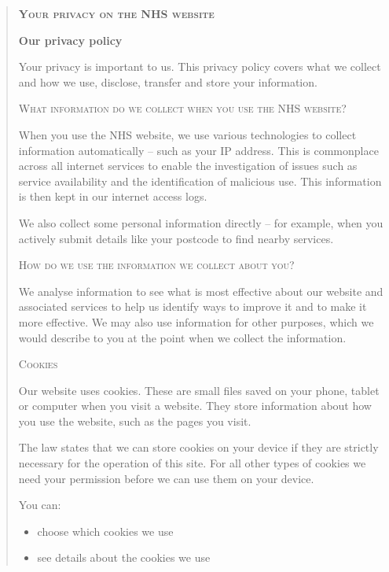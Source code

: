 \documentclass[twocolumn, letterpaper,13pt]{scrartcl}
\begin{document}
	\begin{quote}
        \textbf{\textsc{Your privacy on the NHS website}}
        
        \textbf{Our privacy policy}
        
        Your privacy is important to us. This privacy policy covers what we collect and how we use, disclose, transfer and store your information.
        
        \textsc{What information do we collect when you use the NHS website?}
        
        When you use the NHS website, we use various technologies to collect information automatically – such as your IP address. This is commonplace across all internet services to enable the investigation of issues such as service availability and the identification of malicious use. This information is then kept in our internet access logs.
        
        We also collect some personal information directly – for example, when you actively submit details like your postcode to find nearby services.
        
        \textsc{How do we use the information we collect about you?}
        
        We analyse information to see what is most effective about our website and associated services to help us identify ways to improve it and to make it more effective. We may also use information for other purposes, which we would describe to you at the point when we collect the information.
        
        \textsc{Cookies}
        
        Our website uses cookies. These are small files saved on your phone, tablet or computer when you visit a website. They store information about how you use the website, such as the pages you visit.
        
        The law states that we can store cookies on your device if they are strictly necessary for the operation of this site. For all other types of cookies we need your permission before we can use them on your device.
        
        You can:
        
        \begin{itemize}
            \item choose which cookies we use
            \item see details about the cookies we use
        \end{itemize}
        

\end{quote}
\end{document}
